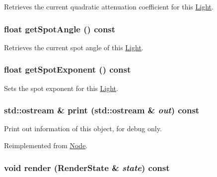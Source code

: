 Retrieves the current quadratic attenuation coefficient for this \hyperlink{classm3g_1_1Light}{Light}. \hypertarget{classm3g_1_1Light_1117f914d754fe74c090dc97bde905eb}{
\subsubsection[{getSpotAngle}]{\setlength{\rightskip}{0pt plus 5cm}float getSpotAngle () const}}
\label{classm3g_1_1Light_1117f914d754fe74c090dc97bde905eb}


Retrieves the current spot angle of this \hyperlink{classm3g_1_1Light}{Light}. \hypertarget{classm3g_1_1Light_a359fee191741efb7e576616a59a76f7}{
\subsubsection[{getSpotExponent}]{\setlength{\rightskip}{0pt plus 5cm}float getSpotExponent () const}}
\label{classm3g_1_1Light_a359fee191741efb7e576616a59a76f7}


Sets the spot exponent for this \hyperlink{classm3g_1_1Light}{Light}. \hypertarget{classm3g_1_1Light_6fea17fa1532df3794f8cb39cb4f911f}{
\subsubsection[{print}]{\setlength{\rightskip}{0pt plus 5cm}std::ostream \& print (std::ostream \& {\em out}) const}}
\label{classm3g_1_1Light_6fea17fa1532df3794f8cb39cb4f911f}


Print out information of this object, for debug only. 

Reimplemented from \hyperlink{classm3g_1_1Node_6fea17fa1532df3794f8cb39cb4f911f}{Node}.\hypertarget{classm3g_1_1Light_8babc8a79b78615da51161e94029eea9}{
\subsubsection[{render}]{\setlength{\rightskip}{0pt plus 5cm}void render ({\bf RenderState} \& {\em state}) const}}
\label{classm3g_1_1Light_8babc8a79b78615da51161e94029eea9}


